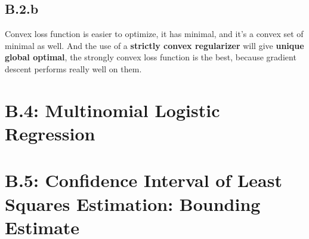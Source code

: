 \documentclass[]{article}
\begin{document}
    \subsection*{B.2.b}
        Convex loss function is easier to optimize, it has minimal, and it's a convex set of minimal as well. And the use of a \textbf{strictly convex regularizer} will give \textbf{unique global optimal}, the strongly convex loss function is the best, because gradient descent performs really well on them. 
\section*{B.4: Multinomial Logistic Regression}

\section*{B.5: Confidence Interval of Least Squares Estimation: Bounding Estimate}
\end{document}
